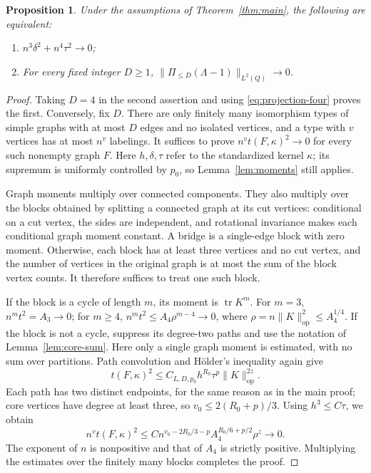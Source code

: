 \documentclass[11pt,reqno]{amsart}
\numberwithin{equation}{section}
\newtheorem{proposition}[theorem]{Proposition}
\theoremstyle{definition}
\theoremstyle{remark}
\theoremstyle{definition}
\DeclareMathOperator{\tr}{tr}
\begin{document}
\begin{proposition}\label{prop:fixed-degree}
Under the assumptions of Theorem~\ref{thm:main}, the following are equivalent:
\begin{enumerate}
 \item $n^3\delta^2+n^4\tau^2\to0$; 
 \item For every fixed integer $D\ge1$, $\|\Pi_{\le D}(\Lambda-1)\|_{L^2(Q)}\to0$.
\end{enumerate}
\end{proposition}
\begin{proof}
Taking $D=4$ in the second assertion and using \eqref{eq:projection-four} proves the first.
Conversely, fix $D$. There are only finitely many isomorphism types of simple graphs with at most $D$ edges and no isolated vertices,
and a type with $v$ vertices has at most $n^v$ labelings.
It suffices to prove $n^v t(F,\kappa)^2\to0$ for every such nonempty graph $F$.
Here $h,\delta,\tau$ refer to the standardized kernel $\kappa$;
its supremum is uniformly controlled by $p_0$, so Lemma~\ref{lem:moments} still applies.

Graph moments multiply over connected components. They also multiply over the blocks obtained by splitting a connected graph at its cut vertices:
conditional on a cut vertex, the sides are independent, and rotational invariance makes each conditional graph moment constant.
A bridge is a single-edge block with zero moment.
Otherwise, each block has at least three vertices and no cut vertex, and
the number of vertices in the original graph is at most the sum of the block vertex counts.
It therefore suffices to treat one such block.

If the block is a cycle of length $m$, its moment is $\tr K^m$.
For $m=3$, $n^m t^2=A_3\to0$; for $m\ge4$,
$n^m t^2\le A_4\rho^{m-4}\to0$, where $\rho=n\|K\|_{\mathrm{op}}^2\le A_4^{1/4}$.
If the block is not a cycle, suppress its degree-two paths and use the notation of Lemma~\ref{lem:core-sum}.
Here only a single graph moment is estimated, with no sum over partitions.
Path convolution and H\"older's inequality again give
\[
 t(F,\kappa)^2\le C_{L,D,p_0}h^{R_0}\tau^p\|K\|_{\mathrm{op}}^{2z}.
\]
Each path has two distinct endpoints, for the same reason as in the main proof; core vertices have degree at least three, so
$v_0\le2(R_0+p)/3$.
Using $h^3\le C\tau$, we obtain
\[
 n^v t(F,\kappa)^2
 \le C n^{v_0-2R_0/3-p}A_4^{R_0/6+p/2}\rho^z\longrightarrow0.
\]
The exponent of $n$ is nonpositive and that of $A_4$ is strictly positive.
Multiplying the estimates over the finitely many blocks completes the proof.
\end{proof}
\end{document}

